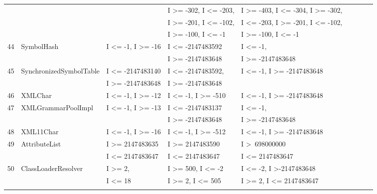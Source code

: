 {\begin{longtable}{|l|l|l|l|l|l|l|l|l|}
	&                         			& 											& I \textgreater= -302, I \textless= -203,	&  I \textgreater= -403, I \textless= -304, I \textgreater= -302,		 \\	
	&                        				& 											& I \textgreater= -201, I \textless= -102, 	&  I \textless= -203, I \textgreater= -201, I \textless= -102,		 \\	
	&                         			& 											& I \textgreater= -100, I \textless= -1		&  I \textgreater= -100, I \textless= -1				 			 \\	
44	& SymbolHash				& I \textless= -1,  I \textgreater= -16			& I \textless= -2147483592			 	& I \textless= -1, 							\\ 
	&							&											& I \textgreater= -2147483648			& I \textgreater= -2147483648				\\
45	& SynchronizedSymbolTable	& I \textless= -2147483140					& I \textless= -2147483592,				& I \textless= -1, I \textgreater= -2147483648	\\ 
	&                                             & I \textgreater= -2147483648				& I \textgreater= -2147483648 			&  			   								\\
46	& XMLChar					& I \textless= -1, I \textgreater= -12			& I \textless= -1, I \textgreater= -510		& I \textless= -1, I \textgreater= -2147483648	\\
47	& XMLGrammarPoolImpl		& I \textless= -1, I \textgreater= -13			& I \textless= -2147483137 				& I \textless= -1, 							\\ 
	&							&											& I \textgreater= -2147483648			& I \textgreater= -2147483648				\\
48	& XML11Char				& I \textless= -1, I \textgreater= -16			& I \textless= -1, I \textgreater= -512		& I \textless= -1, I \textgreater= -2147483648	\\ 
49	& AttributeList				& I \textgreater= 2147483635				& I \textgreater= 2147483590			& I \textgreater~698000000					\\ 
	&                                             & I \textless= 2147483647					& I \textless= 2147483647				& I \textless= 2147483647 					\\
50	& ClassLoaderResolver		&  I \textgreater= 2,						       & I \textgreater= 500, I \textless= -2			& I \textless= -2, I \textgreater -2147483648  								  \\ 
	&                                             &  I \textless= 18						       & I \textgreater= 2, I \textless= 505			& I \textgreater= 2, I \textless= 2147483647			   					  \\
	\hline
	\label{table:stripDomains}
\end{longtable}
}





